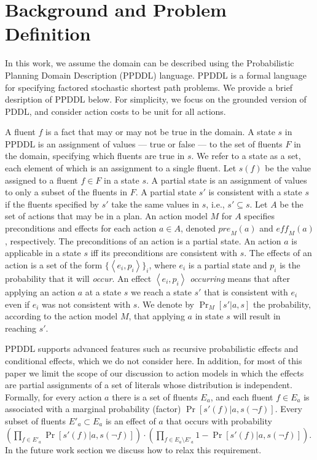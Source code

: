 \documentclass[letterpaper]{article} %
\newcommand{\eff}{\textit{eff}}
\newcommand{\pre}{\textit{pre}}
\newcommand{\tuple}[1]{\ensuremath{\left \langle #1 \right \rangle }}
\begin{document}
 


\section{Background and Problem Definition}



In this work, we assume the domain can be described using the Probabilistic Planning Domain Description (PPDDL) language. 
PPDDL is a formal language for specifying factored stochastic shortest path problems. We provide a brief desription of PPDDL below. 
For simplicity, we focus on the grounded version of PDDL, and consider action costs to be unit for all actions. 

A fluent $f$ is a fact that may or may not be true in the domain. 
A state $s$ in PPDDL is an assignment of values --- true or false --- to the set of fluents $F$ in the domain, specifying which fluents are true in $s$. 
We refer to a state as a set, each element of which is an assignment to a single fluent.
Let $s(f)$ be the value assigned to a fluent $f\in F$ in a state $s$. 
A partial state is an assignment of values to only a subset of the fluents in $F$. 
A partial state $s'$ is consistent with a state $s$ 
if the fluents specified by $s'$ take the same values in $s$, i.e., $s'\subseteq s$. 
Let $A$ be the set of actions that may be in a plan. 
An action model $M$ for $A$ specifies preconditions and effects for each action $a\in A$, 
denoted $\pre_M(a)$ and $\eff_M(a)$, respectively. 
The preconditions of an action is a partial state. 
An action $a$ is applicable in a state $s$ iff its preconditions are consistent with $s$. 
The effects of an action is a set of the form $\{ \tuple{e_i, p_i} \}_i$, 
where $e_i$ is a partial state and $p_i$ is the probability that it will \emph{occur}. 
An effect $\tuple{e_i, p_i}$ \emph{occurring} means that after applying an action $a$ at a state $s$ we reach a state $s'$ that is consistent with $e_i$ even if $e_i$ was not consistent with $s$. We denote by $\Pr_M[s'|a,s]$ the probability, according to the action model $M$, 
that applying $a$ in state $s$ will result in reaching $s'$. 

PPDDL supports advanced features such as recursive probabilistic effects and conditional effects, which we do not consider here. In addition, for most of this paper we limit the scope of our discussion to action models in which the effects are partial assignments of a set of literals whose distribution is independent. 
Formally, for every action $a$ there is a set of fluents $E_a$, 
and each fluent $f\in E_a$ is associated with a marginal probability (factor) $\Pr[s'(f)|a,s(\neg f)]$. 
Every subset of fluents $E'_a\subset E_a$ is an effect of $a$ that occurs with probability $(\prod_{f\in E'_a} \Pr[s'(f)|a,s(\neg f)])\cdot(\prod_{f\in E_a\setminus E'_a} 1-\Pr[s'(f)|a,s(\neg f)])$. 
In the future work section we discuss how to relax this requirement. 
\end{document}
